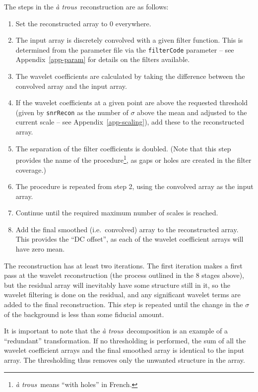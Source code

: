 \documentclass[12pt,a4paper]{article}
\newcommand{\ie}{i.e.\ }
\newcommand{\atrous}{\textit{{\`a} trous}}
\begin{document}
The steps in the \atrous\ reconstruction are as follows:
\begin{enumerate}
\item Set the reconstructed array to 0 everywhere.
\item The input array is discretely convolved with a given filter
  function. This is determined from the parameter file via the
  \texttt{filterCode} parameter -- see Appendix~\ref{app-param} for
  details on the filters available.
\item The wavelet coefficients are calculated by taking the difference
  between the convolved array and the input array.
\item If the wavelet coefficients at a given point are above the
  requested threshold (given by \texttt{snrRecon} as the number of
  $\sigma$ above the mean and adjusted to the current scale -- see
  Appendix~\ref{app-scaling}), add these to the reconstructed array.
\item The separation of the filter coefficients is doubled. (Note that
  this step provides the name of the procedure\footnote{\atrous\ means
  ``with holes'' in French.}, as gaps or holes are created in the
  filter coverage.)
\item The procedure is repeated from step 2, using the convolved array
  as the input array.
\item Continue until the required maximum number of scales is reached.
\item Add the final smoothed (\ie convolved) array to the
  reconstructed array. This provides the ``DC offset'', as each of the
  wavelet coefficient arrays will have zero mean.
\end{enumerate}

The reconstruction has at least two iterations. The first iteration
makes a first pass at the wavelet reconstruction (the process outlined
in the 8 stages above), but the residual array will inevitably have
some structure still in it, so the wavelet filtering is done on the
residual, and any significant wavelet terms are added to the final
reconstruction. This step is repeated until the change in the $\sigma$
of the background is less than some fiducial amount.

It is important to note that the \atrous\ decomposition is an
example of a ``redundant'' transformation. If no thresholding is
performed, the sum of all the wavelet coefficient arrays and the final
smoothed array is identical to the input array. The thresholding thus
removes only the unwanted structure in the array.
\end{document}
